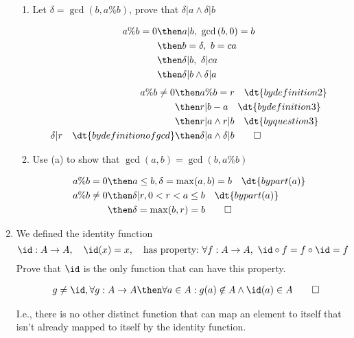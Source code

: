 \documentclass[basic, header]{nosvagor-notes}
\begin{document}
\begin{enumerate}[itemsep=8em]
\begin{enumerate}
        \item Let \(\delta = \gcd(b, a\%b)\), prove that \(\delta|a \land
          \delta|b\)

          \begin{align*}
            a\%b = 0 &\then a|b,~\gcd{(b,0)} = b \\
                     &\then b = \delta,~ b = ca \\
                     &\then \delta|b,~ \delta|ca \\
                     &\then \delta|b \land \delta|a
          \end{align*}
          \begin{align*}
            a\%b \neq 0 &\then a\%b = r \quad \dt{by definition 2} \\
                        &\then r|b-a \quad \dt{by definition 3} \\
                        &\then r|a \land r|b \quad \dt{by question 3} \\
                        \delta | r \quad \dt{by definition of gcd}
                        &\then \delta|a \land \delta|b \qed
          \end{align*}

        \item Use (a) to show that \(\gcd(a,b) = \gcd(b, a\%b)\)

          \begin{align*}
            a\%b = 0 &\then a \leq b, \delta = \max(a,b) = b \quad \dt{by part (a)} \\
            a\%b \neq 0 &\then \delta|r, 0 < r < a \leq b \quad \dt{by part (a)} \\
            &\then \delta = \max(b, r) = b \qed
          \end{align*}

      \end{enumerate}

  \newpage %

    \item We defined the identity function
      \[%
       \id : A \to A, \quad \id(x) = x, \quad  \text{has property:}~\forall f :
       A\to A,~ \id \circ f = f \circ \id = f
      \]%
      Prove that \(\id\) is the only function that can have this property.

      \begin{align*}
        \quad g \neq \id, \forall g : A \to A \then \forall a \in A : g(a)\not\in A \land \id(a) \in A \qed
      \end{align*}

      I.e., there is no other distinct function that can map an element to
      itself that isn't already mapped to itself by the identity function.

\end{enumerate}
\end{document}
